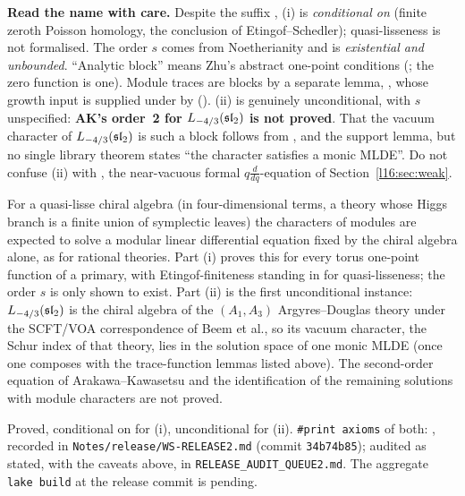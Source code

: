 \begin{dictionary}
\textbf{Read the name with care.} Despite the suffix , (i) is \emph{conditional on }
(finite zeroth Poisson homology, the conclusion of Etingof--Schedler); quasi-lisseness is not formalised. The order $s$
comes from Noetherianity and is \emph{existential and unbounded}. ``Analytic block'' means Zhu's abstract one-point
conditions (; the zero function is one). Module traces are blocks by a separate lemma,
, whose growth input  is supplied under  by
 (). (ii) is genuinely
unconditional, with $s$ unspecified: \textbf{AK's order~2 for $L_{-4/3}(\mathfrak{sl}_2)$ is not proved}. That the vacuum
character of $L_{-4/3}(\mathfrak{sl}_2)$ is such a block follows from ,
 and the support lemma, but no single library theorem states ``the character
satisfies a monic MLDE''. Do not confuse (ii) with \allowbreak{}\allowbreak{}\allowbreak{}\allowbreak{},
the near-vacuous formal $q\frac{d}{dq}$-equation of Section~\ref{l16:sec:weak}.
\end{dictionary}

\begin{physics}
For a quasi-lisse chiral algebra (in four-dimensional terms, a theory whose Higgs branch is a finite union of symplectic
leaves) the characters of modules are expected to solve a modular linear differential equation fixed by the chiral
algebra alone, as for rational theories. Part (i) proves this for every torus one-point function of a primary, with
Etingof-finiteness standing in for quasi-lisseness; the order $s$ is only shown to exist. Part (ii) is the first
unconditional instance: $L_{-4/3}(\mathfrak{sl}_2)$ is the chiral algebra of the $(A_1,A_3)$ Argyres--Douglas theory under the
SCFT/VOA correspondence of Beem et al., so its vacuum character, the Schur index of that theory, lies in the solution
space of one monic MLDE (once one composes with the trace-function lemmas listed above). The second-order equation of
Arakawa--Kawasetsu and the identification of the remaining solutions with module characters are not proved.
\end{physics}

\begin{status}
Proved, conditional on  for (i), unconditional for (ii). \texttt{\#print axioms} of both:
\lean{[propext, Classical.}\allowbreak{}\allowbreak\lean{sound]}, recorded in
\texttt{Notes/\allowbreak release/\allowbreak WS-RELEASE2.md} (commit \texttt{34b74b85}); audited as stated, with the
caveats above, in \texttt{RELEASE\_AUDIT\_QUEUE2.md}. The aggregate \texttt{lake build} at the release commit is pending.
\end{status}

